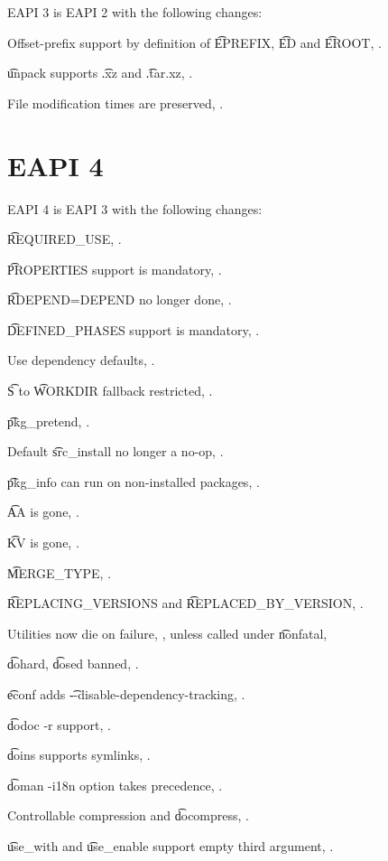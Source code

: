 EAPI 3 is EAPI 2 with the following changes:
\begin{compactitem}
\item Offset-prefix support by definition of \t{EPREFIX}, \t{ED} and \t{EROOT},
    .
\item \t{unpack} supports \t{.xz} and \t{.tar.xz}, .
\item File modification times are preserved, .
\end{compactitem}

\section*{EAPI 4}

EAPI 4 is EAPI 3 with the following changes:

\begin{compactitem}
\item \t{REQUIRED_USE}, .
\item \t{PROPERTIES} support is mandatory, .
\item \t{RDEPEND=DEPEND} no longer done, .
\item \t{DEFINED_PHASES} support is mandatory, .
\item Use dependency defaults, .
\item \t{S} to \t{WORKDIR} fallback restricted, .
\item \t{pkg_pretend}, .
\item Default \t{src_install} no longer a no-op, .
\item \t{pkg_info} can run on non-installed packages, .
\item \t{AA} is gone, .
\item \t{KV} is gone, .
\item \t{MERGE_TYPE}, .
\item \t{REPLACING_VERSIONS} and \t{REPLACED_BY_VERSION}, .
\item Utilities now die on failure, , unless called under \t{nonfatal},
\item \t{dohard}, \t{dosed} banned, .
\item \t{econf} adds \t{-{}-disable-dependency-tracking}, .
\item \t{dodoc -r} support, .
\item \t{doins} supports symlinks, .
\item \t{doman -i18n} option takes precedence, .
\item Controllable compression and \t{docompress}, .
\item \t{use_with} and \t{use_enable} support empty third argument, .
\end{compactitem}

